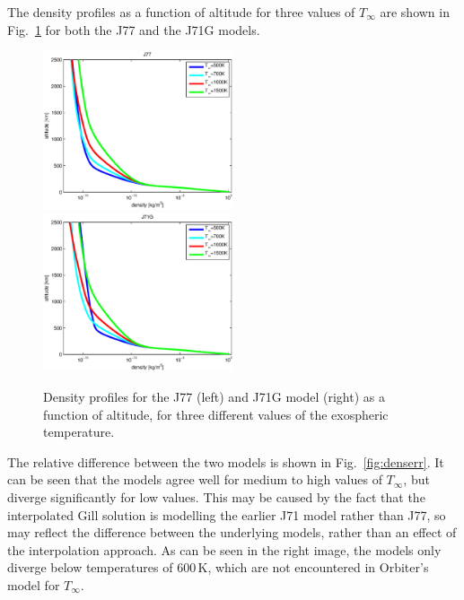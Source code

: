 \documentclass[Orbiter Technical Reference.tex]{subfiles}
\begin{document}
The density profiles as a function of altitude for three values of $T_\infty$ are shown in Fig.~\ref{fig:dens} for both the J77 and the J71G models.
\begin{figure}
\includegraphics[width=0.5\textwidth]{dens_j77.eps}
\includegraphics[width=0.5\textwidth]{dens_j71g.eps}
\caption{Density profiles for the J77 (left) and J71G model (right) as a function of altitude, for three different values of the exospheric temperature.}
\label{fig:dens}
\end{figure}
The relative difference between the two models is shown in Fig.~\ref{fig:denserr}. It can be seen that the models agree well for medium to high values of $T_\infty$, but diverge significantly for low values. This may be caused by the fact that the interpolated Gill solution is modelling the earlier J71 model rather than J77, so may reflect the difference between the underlying models, rather than an effect of the interpolation approach. As can be seen in the right image, the models only diverge below temperatures of 600\,K, which are not encountered in Orbiter's model for $T_\infty$.
\end{document}
